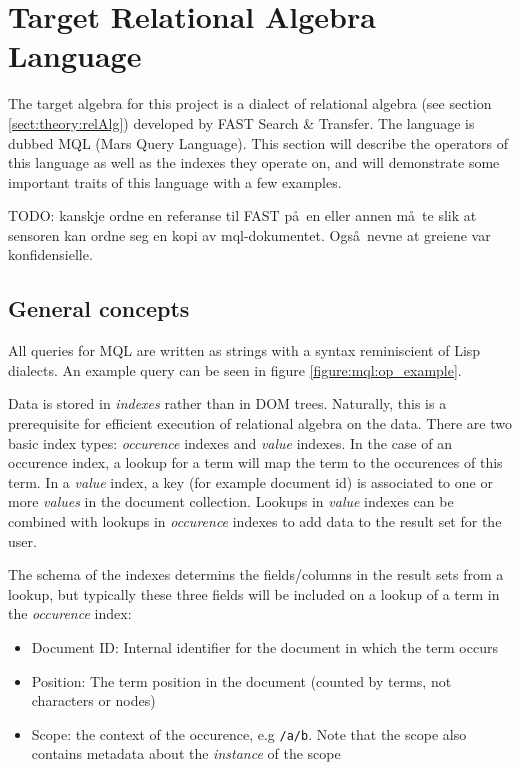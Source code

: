 \section{Target Relational Algebra Language}
\label{sect:method:mql}
The target algebra for this project is a dialect of relational algebra (see
section \ref{sect:theory:relAlg}) developed by FAST Search \& Transfer. The
language is dubbed MQL (Mars Query Language). This section will describe the
operators of this language as well as the indexes they operate on, and will
demonstrate some important traits of this language with a few examples. 

TODO: kanskje ordne en referanse til FAST p\aa~en eller annen m\aa~te slik at
sensoren kan ordne seg en kopi av mql-dokumentet. Ogs\aa~nevne at greiene var
konfidensielle.

\subsection{General concepts}
\label{sect:method:mql:indexes}
\label{sect:method:mql:concepts}
All queries for MQL are written as strings with a syntax reminiscient of Lisp
dialects. An example query can be seen in figure \ref{figure:mql:op_example}.

Data is stored in \textit{indexes} rather than in DOM trees. Naturally, this is a prerequisite for efficient
execution of relational algebra on the data. There are two basic index types: \textit{occurence} indexes and
\textit{value} indexes. In the case of an occurence index, a lookup for a term will map the term to the occurences
of this term. In a \textit{value} index, a key (for example document id) is associated to one or more
\textit{values} in the document collection. Lookups in \textit{value} indexes can be combined with lookups in
\textit{occurence} indexes to add data to the result set for the user.

The schema of the indexes determins the fields/columns in the result sets from
a lookup, but typically these three fields will be included on a lookup of a
term in the \textit{occurence} index:
\begin{itemize}
  \item Document ID: Internal identifier for the document in which the term
  occurs
  \item Position: The term position in the document (counted by terms, not
  characters or nodes)
  \item Scope: the context of the occurence, e.g \texttt{/a/b}. Note that the
  scope also contains metadata about the \textit{instance} of the scope
\end{itemize}


